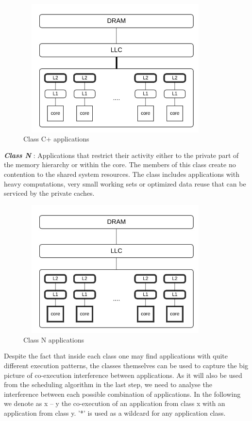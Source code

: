 \documentclass[diploma]{Styles/softlab-thesis}
\begin{document}
\begin{figure}[ht!]
\begin{center}
\includegraphics[width=100mm, height=70mm]{images/category_C+.jpg}
\caption{Class C+ applications \label{overflow}}
\end{center}
\end{figure}

\textbf{\emph{Class N}} : Applications that restrict their activity either to the private part of the memory hierarchy or within the core. The members of this class create no contention to the shared system resources. The class includes applications with heavy computations, very small working sets or optimized data reuse that can be serviced by the private caches. \\ 

\begin{figure}[ht!]
\begin{center}
\includegraphics[width=100mm, height=70mm]{images/category_N.jpg}
\caption{Class N applications \label{overflow}}
\end{center}
\end{figure}

Despite the fact that inside each class one may find applications with quite different execution patterns, the classes themselves can be used to capture the big picture of co-execution interference between applications. As it will also be used from the scheduling algorithm in the last step, we need to analyse the interference between each possible combination of applications. In the following we denote as x – y the co-execution of an application from class x with an application from class y. '*' is used as a wildcard for any application class. \\
\end{document}
